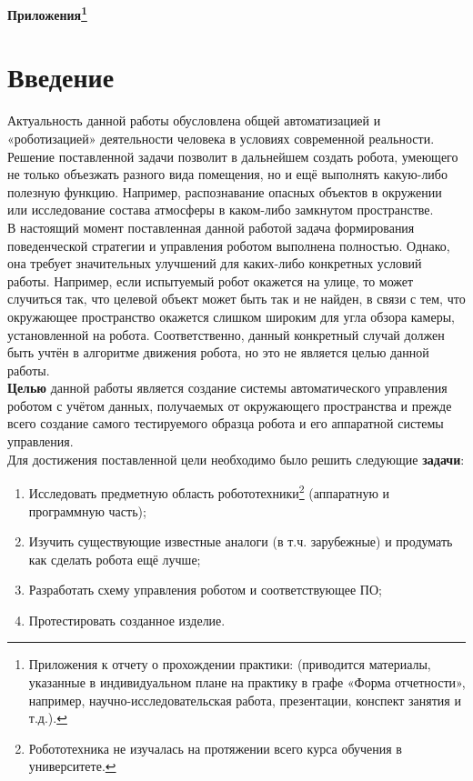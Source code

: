 \documentclass[12pt,a4paper]{scrartcl}
\begin{document}
		\newpage
	
	\begin{center}
		\textbf{Приложения\footnote{Приложения к отчету о прохождении практики: (приводится материалы, указанные в индивидуальном плане на практику в графе «Форма отчетности», например, научно-исследовательская работа, презентации, конспект занятия и т.д.).}}
	\end{center}
	
		\tableofcontents
		
		\newpage
		
		\section*{Введение}
			Актуальность данной работы обусловлена общей автоматизацией и «роботизацией» деятельности человека в условиях современной реальности\cite{bib:AutomatizationRobotization}. Решение поставленной задачи позволит в дальнейшем создать робота, умеющего не только объезжать разного вида помещения, но и ещё выполнять какую-либо полезную функцию. Например, распознавание опасных объектов в окружении или исследование состава атмосферы в каком-либо замкнутом пространстве. \\
			
			В настоящий момент поставленная данной работой задача формирования поведенческой стратегии и управления роботом выполнена полностью. Однако, она требует значительных улучшений для каких-либо конкретных условий работы. Например, если испытуемый робот окажется на улице, то может случиться так, что целевой объект может быть так и не найден, в связи с тем, что окружающее пространство окажется слишком широким для угла обзора камеры, установленной на робота. Соответственно, данный конкретный случай должен быть учтён в алгоритме движения робота, но это не является целью данной работы. \\
			
			\textbf{Целью} данной работы является создание системы автоматического управления роботом с учётом данных, получаемых от окружающего пространства и прежде всего создание самого тестируемого образца робота и его аппаратной системы управления. \\
			
			Для достижения поставленной цели необходимо было решить следующие \textbf{задачи}:
			\begin{enumerate}
				\item Исследовать предметную область робототехники\footnote{Робототехника не изучалась на протяжении всего курса обучения в университете.} (аппаратную и программную часть);
				\item Изучить существующие известные аналоги (в т.ч. зарубежные) и продумать как сделать робота ещё лучше;
				\item Разработать схему управления роботом и соответствующее ПО;
				\item Протестировать созданное изделие.
			\end{enumerate}
			
\end{document}
